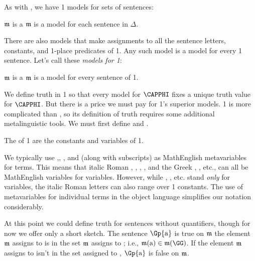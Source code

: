 As with \GSL{}, we have \GQL{}1 models for sets of sentences:

\begin{majorILnc}{}
	$\mathfrak{m}$ is a  \Iff $\mathfrak{m}$ is a model for each sentence in $\Delta$.
\end{majorILnc}

There are also models that make assignments to all the sentence letters, constants, and 1-place predicates of \GQL{}1.
Any such model is a model for every \GQL{}1 sentence.
Let's call these \emph{models for \GQL{}1}:

\begin{majorILnc}{}
	$\mathfrak{m}$ is a  \Iff $\mathfrak{m}$ is a model for every sentence of \GQL{}1.
\end{majorILnc}

We define truth in \GQL{}1 so that every model for $\CAPPHI$ fixes a unique truth value for $\CAPPHI$.
But there is a price we must pay for \GQL{}1's superior models.
\GQL{}1 is more complicated than \GSL{}, so its definition of truth requires some additional metalinguistic tools.
We must first define  and .

\begin{majorILnc}{}
The  of \GQL{}1 are the constants and variables of \GQL{}1.
\end{majorILnc}
\noindent{}We typically use ,, , and   (along with subscripts) as MathEnglish metavariables for terms. This means that italic Roman , , , , and the Greek \mention{$\ALPHA$}, \mention{$\BETA$}, etc., can all be MathEnglish variables for \GQL{} variables.
However, while \mention{$\ALPHA$}, \mention{$\BETA$}, etc. stand \emph{only} for variables, the italic Roman letters can also range over \GQL{}1 constants.
The use of metavariables for individual terms in the object language simplifies our notation considerably.

At this point we could define truth for sentences without quantifiers, though for now we offer only a short sketch.
The sentence $\Gp{\constant{a}}$ is true on $\mathfrak{m}$ \Iff the element $\mathfrak{m}$ assigns to  is in the set $\mathfrak{m}$ assigns to \mention{$\GG$}; i.e., \Iff $\IntA(\constant{a})\in\IntA(\GG)$.
If the element $\mathfrak{m}$ assigns to  isn't in the set assigned to \mention{$\GG$}, $\Gp{\constant{a}}$ is false on $\mathfrak{m}$.

